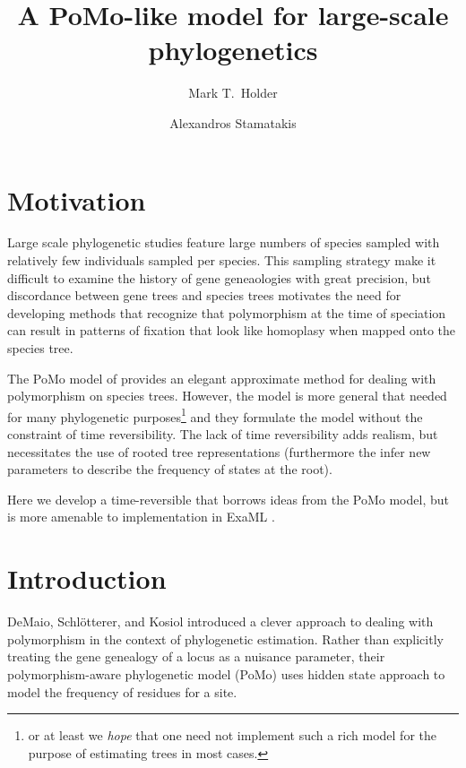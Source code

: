 \documentclass{llncs}
\newcommand{\pomo}{PoMo\xspace}
\begin{document}
\title{A \pomo-like model for large-scale phylogenetics}
\author{Mark T.~Holder\and Alexandros Stamatakis}
\newcommand{\enum}{\addtocounter{equation}{1}\tag{\theequation}}

\maketitle              %
\section {Motivation}
Large scale phylogenetic studies feature large numbers of species sampled with relatively few
    individuals sampled per species.
This sampling strategy make it difficult to examine the history of gene geneaologies with great precision, but 
    discordance between gene trees and species trees motivates the need for developing methods
    that recognize that polymorphism at the time of speciation can result in patterns of fixation
    that look like homoplasy when mapped onto the species tree.

The \pomo model of \cite{DeMaioSK2013} provides an elegant approximate method for dealing with polymorphism 
    on species trees.
However, the model is more general that needed for many phylogenetic purposes\footnote{or at least we {\em hope} that
    one need not implement such a rich model for the purpose of estimating trees in most cases.} and
    they formulate the model without the constraint of time reversibility.
The lack of time reversibility adds realism, but necessitates the use of rooted tree representations (furthermore
    the infer new parameters to describe the frequency of states at the root).

Here we develop a time-reversible that borrows ideas from the \pomo model, but is more amenable to 
    implementation in ExaML \cite{ExaMLInitial,ExaMLLatest}.
\section {Introduction}
DeMaio, Schl\"otterer, and Kosiol \cite{DeMaioSK2013} introduced a clever approach to dealing with polymorphism in the context of
    phylogenetic estimation.
Rather than explicitly treating the gene genealogy of a locus as a nuisance parameter, their polymorphism-aware
    phylogenetic model (\pomo) uses hidden state approach to model the frequency of residues for a site.
\end{document}
